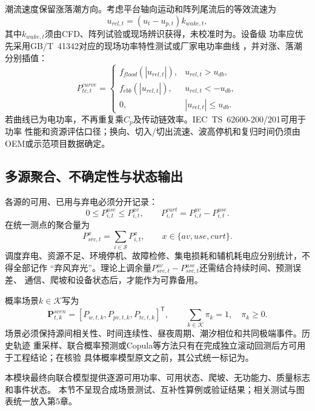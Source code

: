 潮流速度保留涨落潮方向。考虑平台轴向运动和阵列尾流后的等效流速为
\begin{equation}
u_{rel,t}=(u_t-u_{p,t})k_{wake,t},
\label{eq:tidal-relative}
\end{equation}
其中$k_{wake,t}$须由CFD、阵列试验或现场辨识获得，未校准时为\assumptiontag。设备级
功率应优先采用GB/T~41342对应的现场功率特性测试或厂家电功率曲线
\cite{gbt41342}，并对涨、落潮分别插值：
\begin{equation}
P_{tc,t}^{curve}=
\begin{cases}
f_{flood}(|u_{rel,t}|), & u_{rel,t}>u_{db},\\
f_{ebb}(|u_{rel,t}|), & u_{rel,t}<-u_{db},\\
0, & |u_{rel,t}|\le u_{db}.
\end{cases}
\label{eq:tidal-curve}
\end{equation}
若曲线已为电功率，不再重复乘$C_p$及传动链效率。IEC~TS~62600-200/201可用于功率
性能和资源评估口径\cite{iec62600}；换向、切入/切出流速、波高停机和复归时间仍须由
OEM或示范项目数据确定。

\subsection{多源聚合、不确定性与状态输出}

各源的可用、已用与弃电必须分开记录：
\begin{equation}
0\le P_{i,t}^{use}\le P_{i,t}^{av},\qquad
P_{i,t}^{curt}=P_{i,t}^{av}-P_{i,t}^{use}.
\label{eq:source-use-curt}
\end{equation}
在统一测点的聚合量为
\begin{equation}
P_{src,t}^{x}=\sum_{i\in\mathcal S}P_{i,t}^{x},
\qquad x\in\{av,use,curt\}.
\label{eq:source-aggregate}
\end{equation}
调度弃电、资源不足、环境停机、故障检修、集电损耗和辅机耗电应分别统计，不得全部记作
“弃风弃光”。理论上调余量$P_{src,t}^{av}-P_{src,t}^{use}$还需结合持续时间、预测误差、
通信、爬坡和设备状态后，才能作为可靠备用。

概率场景$k\in\mathcal K$写为
\begin{equation}
\bm P_{t,k}^{scen}=
[P_{w,t,k},P_{pv,t,k},P_{tc,t,k}]^{\mathsf T},\qquad
\sum_{k\in\mathcal K}\pi_k=1,\quad \pi_k\ge0.
\label{eq:joint-source-scenario}
\end{equation}
场景必须保持源间相关性、时间连续性、昼夜周期、潮汐相位和共同极端事件。历史轨迹
重采样、联合概率预测或Copula等方法只有在完成独立滚动回测后方可用于工程结论；在核验
具体概率模型原文之前，其公式统一标记为\verifytag。

本模块最终向联合模型提供逐源可用功率、可用状态、爬坡、无功能力、质量标志和事件状态。
本节不呈现合成场景测试、互补性算例或验证结果；相关测试与图表统一放入第5章。
